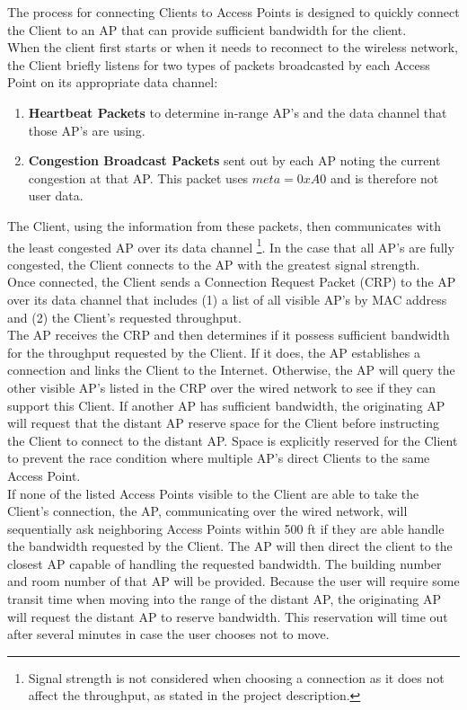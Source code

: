 \documentclass[11pt,twocolumn]{article}
\begin{document}
\indent
The process for connecting Clients to Access Points is designed to quickly connect the Client to an AP that can provide sufficient bandwidth for 
the client.\\
\indent
When the client first starts or when it needs to reconnect to the wireless network, the Client briefly listens for two types of packets broadcasted 
by each Access Point on its appropriate data channel:
\begin{enumerate}
	\item \textbf{Heartbeat Packets} to determine in-range AP's and the data channel that those AP's are using.
	\item \textbf{Congestion Broadcast Packets} sent out by each AP noting the current congestion at that AP. This packet uses $meta=0xA0$ and is therefore
	not user data.
\end{enumerate}
\indent
The Client, using the information from these packets, then communicates with the least congested AP over its data channel 
\footnote{Signal strength is not considered when choosing a connection as it does not affect the throughput, as stated in the project 
description.}. In the case that all AP's are fully congested, the Client connects to the AP with the greatest signal strength.\\
\indent
Once connected, the Client sends a Connection Request Packet (CRP) to the AP over its data channel that includes (1) a list of all visible AP's by 
MAC address and (2) the Client's requested throughput. \\
\indent
The AP receives the CRP and then determines if it possess sufficient bandwidth for the throughput requested by the Client. If it does, the AP 
establishes a connection and links the Client to the Internet. Otherwise, the AP will query the other visible AP's listed in the CRP over 
the wired network to see if they can support this Client. If another AP has sufficient bandwidth, the originating AP will request 
that the distant AP reserve space for the Client before instructing the Client to connect to the distant AP. Space is explicitly reserved for the 
Client to prevent the race condition where multiple AP's direct Clients to the same Access Point.\\
\indent
If none of the listed Access Points visible to the Client are able to take the Client's connection, the AP, communicating over the wired network, will 
sequentially ask neighboring Access Points within 500 ft if they are able handle the bandwidth requested by the Client. The AP will then direct the client to the closest AP 
capable of handling the requested bandwidth. The building number and room number of that AP will be provided. Because the user will require some transit time when moving into the range 
of the distant AP, the originating AP will request the distant AP to reserve bandwidth. This reservation will time out after several minutes in case the user
chooses not to move. \\
\end{document}
